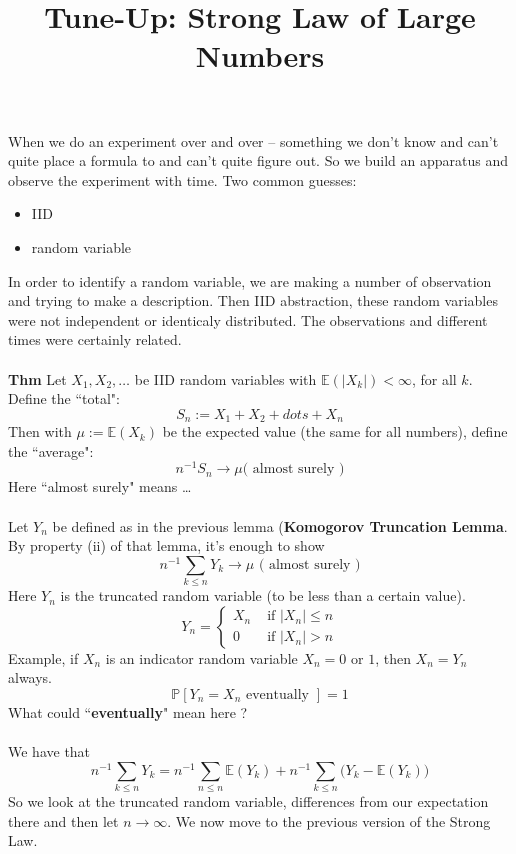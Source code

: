 \documentclass[12pt]{article}
\title{Tune-Up: Strong Law of Large Numbers}
\date{}
\begin{document}
\sffamily

\maketitle

{\fontsize{16pt}{16pt}\selectfont 

\noindent When we do an experiment over and over -- something we don't know and can't quite place a formula to and can't quite figure out.  So we build an apparatus and observe the experiment with time.  Two common guesses:
\begin{itemize}
\item IID
\item random variable
\end{itemize}
In order to identify a random variable, we are making a number of observation and trying to make a description.  Then IID abstraction, these random variables were not independent or identicaly distributed.  The observations and different times were certainly related. 
  \\ \\
\noindent \textbf{Thm} Let $X_1, X_2, \dots$ be IID random variables with $\mathbb{E}(|X_k|) < \infty$, for all $k$.  Define the ``total":
$$ S_n := X_1 + X_2 + dots + X_n $$
Then with $\mu := \mathbb{E}(X_k)$ be the expected value (the same for all numbers), define the ``average":
$$ n^{-1} S_n \to \mu  \text{( almost surely )}$$
Here ``almost surely" means \dots  \\ \\
Let $Y_n$ be defined as in the previous lemma (\textbf{Komogorov Truncation Lemma}.  By property (ii) of that lemma, it's enough to show
$$ n^{-1} \sum_{k \leq n} Y_k \to \mu \text{ ( almost surely )} $$
Here $Y_n$ is the truncated random variable (to be less than a certain value).
$$ Y_n = \left\{ \begin{array}{cc} X_n & \text{ if }|X_n| \leq n \\ 0 & \text{ if } |X_n| > n  \end{array}\right. $$
Example, if $X_n$ is an indicator random variable $X_n = 0 \text{ or }1$, then $X_n = Y_n$ always. 
$$ \mathbb{P}[Y_n = X_n \text{ eventually }] = 1 $$
What could ``{\color{blue}\textbf{eventually}}" mean here ? \\ \\
We have that
$$ n^{-1} \sum_{k \leq n } Y_k = n^{-1} \sum_{n \leq n} \mathbb{E}(Y_k) + n^{-1} \sum_{k \leq n} \big( Y_k - \mathbb{E}(Y_k) \big) $$
So we look at the truncated random variable, differences from our expectation there and then let $n \to \infty$.  We now move to the previous version of the Strong Law. \\ \\
}
\end{document}
